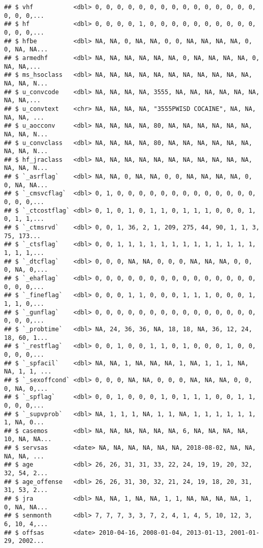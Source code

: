 \documentclass[
]{article}
\begin{document}
\begin{verbatim}
## $ vhf           <dbl> 0, 0, 0, 0, 0, 0, 0, 0, 0, 0, 0, 0, 0, 0, 0, 0, 0, 0,...
## $ hf            <dbl> 0, 0, 0, 0, 1, 0, 0, 0, 0, 0, 0, 0, 0, 0, 0, 0, 0, 0,...
## $ hfbe          <dbl> NA, NA, 0, NA, NA, 0, 0, NA, NA, NA, NA, 0, 0, NA, NA...
## $ armedhf       <dbl> NA, NA, NA, NA, NA, NA, 0, NA, NA, NA, NA, 0, NA, NA,...
## $ ms_hsoclass   <dbl> NA, NA, NA, NA, NA, NA, NA, NA, NA, NA, NA, NA, NA, N...
## $ u_convcode    <dbl> NA, NA, NA, NA, 3555, NA, NA, NA, NA, NA, NA, NA, NA,...
## $ u_convtext    <chr> NA, NA, NA, NA, "3555PWISD COCAINE", NA, NA, NA, NA, ...
## $ u_aocconv     <dbl> NA, NA, NA, NA, 80, NA, NA, NA, NA, NA, NA, NA, NA, N...
## $ u_convclass   <dbl> NA, NA, NA, NA, 80, NA, NA, NA, NA, NA, NA, NA, NA, N...
## $ hf_jraclass   <dbl> NA, NA, NA, NA, NA, NA, NA, NA, NA, NA, NA, NA, NA, N...
## $ `_asrflag`    <dbl> NA, NA, 0, NA, NA, 0, 0, NA, NA, NA, NA, 0, 0, NA, NA...
## $ `_cmsvcflag`  <dbl> 0, 1, 0, 0, 0, 0, 0, 0, 0, 0, 0, 0, 0, 0, 0, 0, 0, 0,...
## $ `_ctcostflag` <dbl> 0, 1, 0, 1, 0, 1, 1, 0, 1, 1, 1, 0, 0, 0, 1, 0, 1, 1,...
## $ `_ctmsrvd`    <dbl> 0, 0, 1, 36, 2, 1, 209, 275, 44, 90, 1, 1, 3, 75, 173...
## $ `_ctsflag`    <dbl> 0, 0, 1, 1, 1, 1, 1, 1, 1, 1, 1, 1, 1, 1, 1, 1, 1, 1,...
## $ `_dtcflag`    <dbl> 0, 0, 0, NA, NA, 0, 0, 0, NA, NA, NA, 0, 0, 0, NA, 0,...
## $ `_ehaflag`    <dbl> 0, 0, 0, 0, 0, 0, 0, 0, 0, 0, 0, 0, 0, 0, 0, 0, 0, 0,...
## $ `_fineflag`   <dbl> 0, 0, 0, 1, 1, 0, 0, 0, 1, 1, 1, 0, 0, 0, 1, 1, 1, 0,...
## $ `_gunflag`    <dbl> 0, 0, 0, 0, 0, 0, 0, 0, 0, 0, 0, 0, 0, 0, 0, 0, 0, 0,...
## $ `_probtime`   <dbl> NA, 24, 36, 36, NA, 18, 18, NA, 36, 12, 24, 18, 60, 1...
## $ `_restflag`   <dbl> 0, 0, 1, 0, 0, 1, 1, 0, 1, 0, 0, 0, 1, 0, 0, 0, 0, 0,...
## $ `_spfacil`    <dbl> NA, NA, 1, NA, NA, NA, 1, NA, 1, 1, 1, NA, NA, 1, 1, ...
## $ `_sexoffcond` <dbl> 0, 0, 0, NA, NA, 0, 0, 0, NA, NA, NA, 0, 0, 0, NA, 0,...
## $ `_spflag`     <dbl> 0, 0, 1, 0, 0, 0, 1, 0, 1, 1, 1, 0, 0, 1, 1, 0, 0, 0,...
## $ `_supvprob`   <dbl> NA, 1, 1, 1, NA, 1, 1, NA, 1, 1, 1, 1, 1, 1, 1, NA, 0...
## $ casemos       <dbl> NA, NA, NA, NA, NA, NA, 6, NA, NA, NA, NA, 10, NA, NA...
## $ servsas       <date> NA, NA, NA, NA, NA, NA, 2018-08-02, NA, NA, NA, NA, ...
## $ age           <dbl> 26, 26, 31, 31, 33, 22, 24, 19, 19, 20, 32, 32, 54, 2...
## $ age_offense   <dbl> 26, 26, 31, 30, 32, 21, 24, 19, 18, 20, 31, 31, 53, 2...
## $ jra           <dbl> NA, NA, 1, NA, NA, 1, 1, NA, NA, NA, NA, 1, 0, NA, NA...
## $ senmonth      <dbl> 7, 7, 7, 3, 3, 7, 2, 4, 1, 4, 5, 10, 12, 3, 6, 10, 4,...
## $ offsas        <date> 2010-04-16, 2008-01-04, 2013-01-13, 2001-01-29, 2002...

\end{verbatim}
\end{document}
